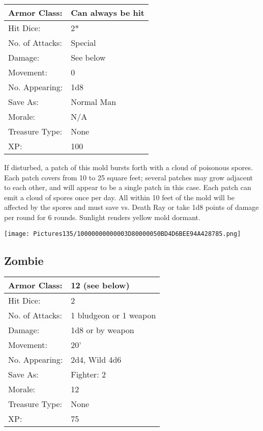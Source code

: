 \documentclass[a4paper,twoside,openany,10pt]{book}
\begin{document}
\begin{multicols}{2}
\begin{tabularx}{0.50\textwidth}{@{}lX@{}}
Armor Class: & Can always be hit \\\hline
Hit Dice: & 2*  \\\hline
No. of Attacks: & Special \\\hline
Damage: & See below \\\hline
Movement: & 0 \\\hline
No. Appearing: & 1d8 \\\hline
Save As: & Normal Man \\\hline
Morale: & N/A \\\hline
Treasure Type: & None \\\hline
XP: & 100 \\\hline
\end{tabularx}

If disturbed, a patch of this mold bursts forth with a cloud of poisonous spores. Each patch covers from 10 to 25 square feet; several patches may grow adjacent to each other, and will appear to be a single patch in this case. Each patch can emit a cloud of spores once per day. All within 10 feet of the mold will be affected by the spores and must save vs. Death Ray or take 1d8 points of damage per round for 6 rounds. Sunlight renders yellow mold dormant.

\begin{center} \texttt{[image: Pictures135/10000000000003D80000050BD4D6BEE94A428785.png]} \end{center}

\subsection*{Zombie}\label{zombie}

\begin{tabularx}{0.50\textwidth}{@{}lX@{}}
Armor Class: & 12 (see below) \\\hline
Hit Dice: & 2 \\\hline
No. of Attacks: & 1 bludgeon or 1 weapon \\\hline
Damage: & 1d8 or by weapon \\\hline
Movement: & 20' \\\hline
No. Appearing: & 2d4, Wild 4d6 \\\hline
Save As: & Fighter: 2 \\\hline
Morale: & 12 \\\hline
Treasure Type: & None \\\hline
XP: & 75 \\\hline
\end{tabularx}\medskip


\end{multicols}
\end{document}
